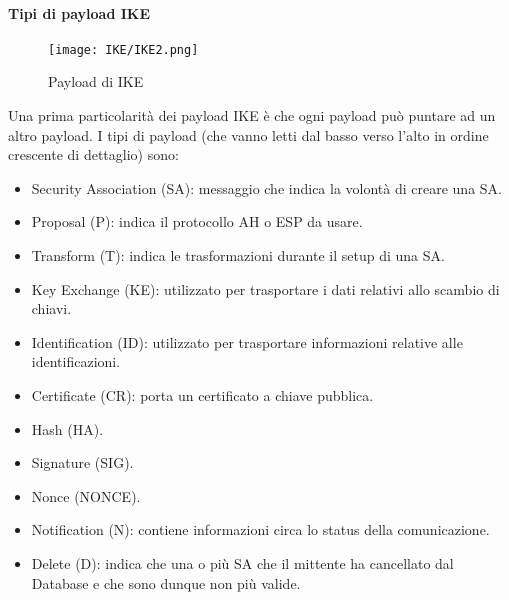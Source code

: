 \documentclass[14pt]{extreport}
\begin{document}
\paragraph{Tipi di payload IKE}








\begin{figure}[H]
    \centering
    \texttt{[image: IKE/IKE2.png]}
    \caption{Payload di IKE}
    \label{ike2}
\end{figure}

Una prima particolarità dei payload IKE è che ogni payload può puntare ad un altro payload. I tipi di payload (che vanno letti dal basso verso l'alto in ordine crescente di dettaglio) sono:


\begin{itemize}
    \item Security Association (SA): messaggio che indica la volontà di creare una SA.
    
    
    \item Proposal (P): indica il protocollo AH o ESP da usare.
    
    
    \item Transform (T): indica le trasformazioni durante il setup di una SA.
    
    \item Key Exchange (KE): utilizzato per trasportare i dati relativi allo scambio di chiavi.
    
    
    \item Identification (ID): utilizzato per trasportare informazioni relative alle identificazioni.
    
    
    \item Certificate (CR): porta un certificato a chiave pubblica.
    
    
    \item Hash (HA).
    
    \item Signature (SIG).
    
    \item Nonce (NONCE).
    
    \item Notification (N): contiene informazioni circa lo status della comunicazione.
    
    
    \item Delete (D): indica che una o più SA che il mittente ha cancellato dal Database e che sono dunque non più valide.
\end{itemize}
\end{document}
